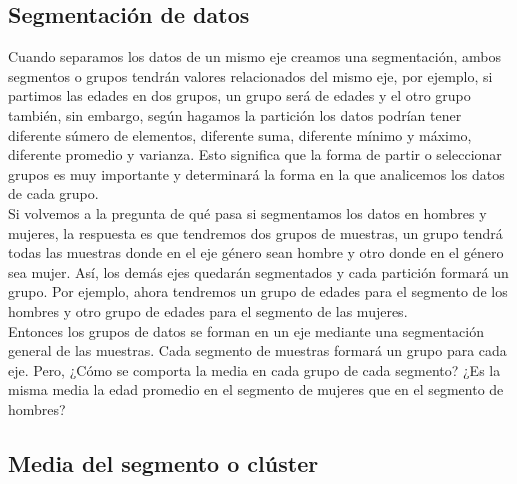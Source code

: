 \documentclass{article}
\begin{document}
\subsection{Segmentación de datos}

Cuando separamos los datos de un mismo eje creamos una segmentación, ambos segmentos o grupos tendrán valores relacionados del mismo eje, por ejemplo, si partimos las edades en dos grupos, un grupo será de edades y el otro grupo también, sin embargo, según hagamos la partición los datos podrían tener diferente súmero de elementos, diferente suma, diferente mínimo y máximo, diferente promedio y varianza. Esto significa que la forma de partir o seleccionar grupos es muy importante y determinará la forma en la que analicemos los datos de cada grupo.
\\[12pt]
Si volvemos a la pregunta de qué pasa si segmentamos los datos en hombres y mujeres, la respuesta es que tendremos dos grupos de muestras, un grupo tendrá todas las muestras donde en el eje género sean hombre y otro donde en el género sea mujer. Así, los demás ejes quedarán segmentados y cada partición formará un grupo. Por ejemplo, ahora tendremos un grupo de edades para el segmento de los hombres y otro grupo de edades para el segmento de las mujeres.
\\[12pt]
Entonces los grupos de datos se forman en un eje mediante una segmentación general de las muestras. Cada segmento de muestras formará un grupo para cada eje. Pero, ¿Cómo se comporta la media en cada grupo de cada segmento? ¿Es la misma media la edad promedio en el segmento de mujeres que en el segmento de hombres?

\subsection{Media del segmento o clúster}
\end{document}
